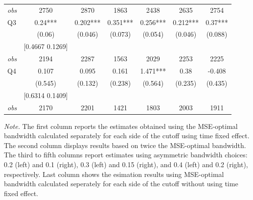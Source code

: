 \begin{table}[]
{\begin{tabular}{lcccccc}
\textit{obs} & 2750 & 2870 & 1863 & 2438 & 2635 & 2754 \\ 
Q3 & 0.24*** & 0.202*** & 0.351*** & 0.256*** & 0.212*** & 0.37*** \\ 
&(0.06)&(0.046) & (0.073)&(0.054)&(0.046)&(0.088)\\ 
& [0.4667 0.1269] & & & & & \\ 
\textit{obs} & 2194 & 2287 & 1563 & 2029 & 2253 & 2225 \\ 
Q4 & 0.107 & 0.095 & 0.161 & 1.471*** & 0.38 & -0.408 \\ 
&(0.545)&(0.132) & (0.238)&(0.564)&(0.235)&(0.435)\\ 
& [0.6314 0.1409] & & & & & \\ 
\textit{obs} & 2170 & 2201 & 1421 & 1803 & 2003 & 1911 \\ 
\hline 
 \end{tabular}}{\textit{Note.} The first column reports the estimates obtained using the MSE-optimal bandwidth calculated separately for each side of the cutoff using time fixed effect. The second column displays results based on twice the MSE-optimal bandwidth. The third to fifth columns report estimates using asymmetric bandwidth choices: 0.2 (left) and 0.1 (right), 0.3 (left) and 0.15 (right), and 0.4 (left) and 0.2 (right), respectively. Last column shows the esimation results using MSE-optimal bandwidth calculated seperately for each side of the cutoff without using time fixed effect.}
\end{table}
